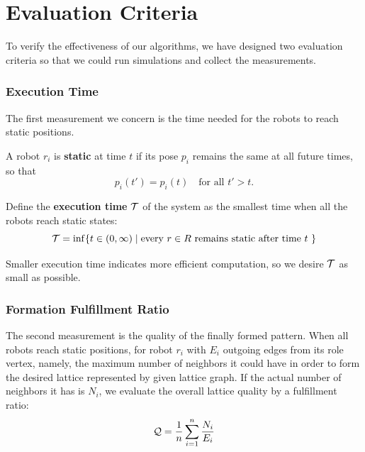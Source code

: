 \section{Evaluation Criteria}
\label{sec:mrf-eval}

To verify the effectiveness of our algorithms, we have designed two evaluation criteria so that we could run simulations and collect the measurements.

\subsubsection{Execution Time}
The first measurement we concern is the time needed for the robots to reach static positions.

\begin{defn}
A robot $r_i$ is \textbf{static} at time $t$ if its pose $p_i$
remains the same at all future times, so that 
  \begin{equation}
    p_i(t') = p_i(t) \quad \mbox {for all } t' > t.
  \end{equation}
\end{defn}

Define the \textbf{execution time} $\mathcal{T}$ of the system as the smallest time when all the robots reach static states:
\begin{equation}
  \mathcal{T} = \inf \{t \in (0, \infty) \mid \mbox{every $r \in R$ remains static
    after time $t$ } \}
\end{equation}

Smaller execution time indicates more efficient computation, so we desire $\mathcal{T}$ as small as possible.

\subsubsection{Formation Fulfillment Ratio}

The second measurement is the quality of the finally formed pattern.
%
When all robots reach static positions, for robot $r_i$
with $E_i$ outgoing edges from its role vertex, 
namely, the maximum number of neighbors it could have in order to form the desired lattice represented by given lattice graph. 
If the actual number of neighbors it has is $N_i$, 
we evaluate the overall lattice quality by a fulfillment ratio:
\begin{equation}\label{eq:gamma}
  \mathcal{Q} = \dfrac{1}{n}\sum\limits_{i=1}^n \frac{N_i}{E_i}
\end{equation}

